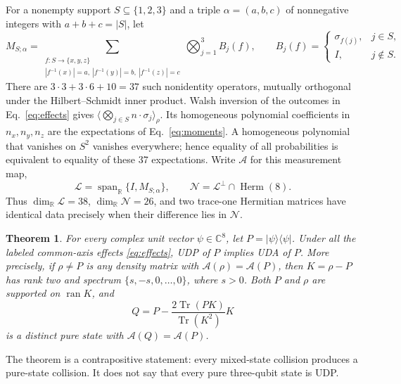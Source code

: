 \documentclass[aps,pra,reprint,onecolumn,superscriptaddress]{revtex4-2}
\newcommand{\NN}{\mathcal N}
\newcommand{\LL}{\mathcal L}
\newcommand{\Tr}{\operatorname{Tr}}
\newtheorem{theorem}{Theorem}
\begin{document}
For a nonempty support \(S\subseteq\{1,2,3\}\) and a triple \(\alpha=(a,b,c)\) of nonnegative integers with \(a+b+c=|S|\), let
\begin{equation}
 M_{S;\alpha}=
 \sum_{\substack{f:S\to\{x,y,z\}\\
 |f^{-1}(x)|=a,\ |f^{-1}(y)|=b,\ |f^{-1}(z)|=c}}
 \bigotimes_{j=1}^3 B_j(f),\qquad
 B_j(f)=
 \begin{cases}\sigma_{f(j)},&j\in S,\\ I,&j\notin S.\end{cases}
 \label{eq:moments}
\end{equation}
There are \(3\cdot3+3\cdot6+10=37\) such nonidentity operators, mutually orthogonal under the Hilbert--Schmidt inner product. Walsh inversion of the outcomes in Eq.~\eqref{eq:effects} gives
\(\langle\bigotimes_{j\in S}n\cdot\sigma_j\rangle_\rho\).
Its homogeneous polynomial coefficients in \(n_x,n_y,n_z\) are the expectations of Eq.~\eqref{eq:moments}. A homogeneous polynomial that vanishes on \(S^2\) vanishes everywhere; hence equality of all probabilities is equivalent to equality of these 37 expectations. Write \(\mathcal A\) for this measurement map,
\begin{equation}
 \LL=\operatorname{span}_{\mathbb R}\{I,M_{S;\alpha}\},\qquad
 \NN=\LL^\perp\cap\operatorname{Herm}(8).
 \label{eq:kernel}
\end{equation}
Thus \(\dim_{\mathbb R}\LL=38\), \(\dim_{\mathbb R}\NN=26\), and two trace-one Hermitian matrices have identical data precisely when their difference lies in \(\NN\).

\begin{theorem}\label{thm:main}
For every complex unit vector \(\psi\in\mathbb C^8\), let \(P=|\psi\rangle\langle\psi|\). Under all the labeled common-axis effects \eqref{eq:effects}, UDP of \(P\) implies UDA of \(P\). More precisely, if \(\rho\ne P\) is any density matrix with \(\mathcal A(\rho)=\mathcal A(P)\), then \(K=\rho-P\) has rank two and spectrum \(\{s,-s,0,\ldots,0\}\), where \(s>0\). Both \(P\) and \(\rho\) are supported on \(\operatorname{ran}K\), and
 \begin{equation}
 Q=P-\frac{2\Tr(PK)}{\Tr(K^2)}K
 \label{eq:Q}
 \end{equation}
is a distinct pure state with \(\mathcal A(Q)=\mathcal A(P)\).
\end{theorem}

The theorem is a contrapositive statement: every mixed-state collision produces a pure-state collision. It does not say that every pure three-qubit state is UDP.
\end{document}
